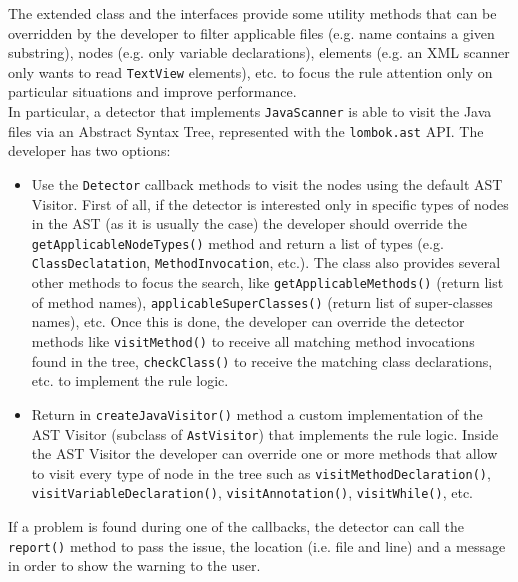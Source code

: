 \documentclass[11pt,a4paper,notitlepage]{article}
\begin{document}
The extended class and the interfaces provide some utility methods that can be overridden by the developer to filter applicable files (e.g. name contains a given substring), nodes (e.g. only variable declarations), elements (e.g. an XML scanner only wants to read \texttt{TextView} elements), etc. to focus the rule attention only on particular situations and improve performance.\\
In particular, a detector that implements \texttt{JavaScanner} is able to visit the Java files via an Abstract Syntax Tree, represented with the \texttt{lombok.ast} API. The developer has two options:
\begin{itemize}
	\item Use the \texttt{Detector} callback methods to visit the nodes using the default AST Visitor. First of all, if the detector is interested only in specific types of nodes in the AST (as it is usually the case) the developer should override the \texttt{getApplicableNodeTypes()} method and return a list of types (e.g. \texttt{ClassDeclatation}, \texttt{MethodInvocation}, etc.). The class also provides several other methods to focus the search, like \texttt{getApplicableMethods()} (return list of method names), \texttt{applicableSuperClasses()} (return list of super-classes names), etc. Once this is done, the developer can override the detector methods like \texttt{visitMethod()} to receive all matching method invocations found in the tree, \texttt{checkClass()} to receive the matching class declarations, etc. to implement the rule logic.
	\item Return in \texttt{createJavaVisitor()} method a custom implementation of the AST Visitor (subclass of \texttt{AstVisitor}) that implements the rule logic. Inside the AST Visitor the developer can override one or more methods that allow to visit every type of node in the tree such as \texttt{visitMethodDeclaration()}, \texttt{visitVariableDeclaration()}, \texttt{visitAnnotation()}, \texttt{visitWhile()}, etc. 
\end{itemize}
If a problem is found during one of the callbacks, the detector can call the \texttt{report()} method to pass the issue, the location (i.e. file and line) and a message in order to show the warning to the user.\smallskip \\
\end{document}

